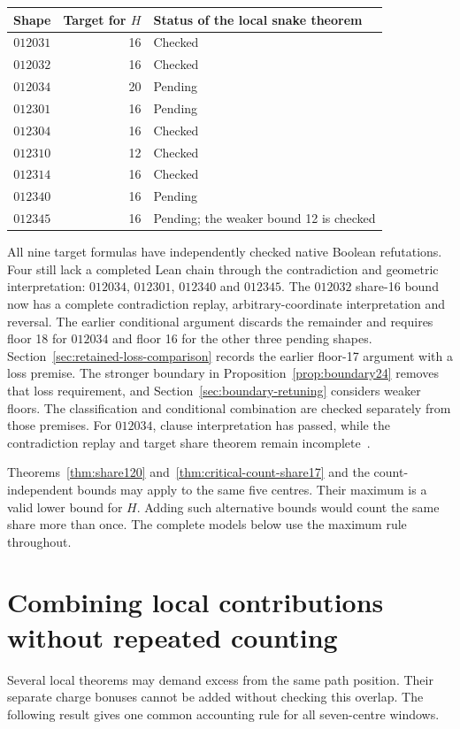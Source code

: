 \documentclass[11pt,a4paper]{article}
\theoremstyle{definition}
\theoremstyle{remark}
\begin{document}
\begin{center}\small
\begin{tabular}{c r l}
\toprule
Shape & Target for $H$ & Status of the local snake theorem\\\midrule
$012031$ & 16 & Checked\\
$012032$ & 16 & Checked\\
$012034$ & 20 & Pending\\
$012301$ & 16 & Pending\\
$012304$ & 16 & Checked\\
$012310$ & 12 & Checked\\
$012314$ & 16 & Checked\\
$012340$ & 16 & Pending\\
$012345$ & 16 & Pending; the weaker bound 12 is checked\\
\bottomrule
\end{tabular}
\end{center}
All nine target formulas have independently checked native Boolean refutations. Four still lack a completed Lean chain through the contradiction and geometric interpretation: $012034$, $012301$, $012340$ and $012345$. The $012032$ share-16 bound now has a complete contradiction replay, arbitrary-coordinate interpretation and reversal. The earlier conditional argument discards the remainder and requires floor 18 for $012034$ and floor 16 for the other three pending shapes. Section~\ref{sec:retained-loss-comparison} records the earlier floor-17 argument with a loss premise. The stronger boundary in Proposition~\ref{prop:boundary24} removes that loss requirement, and Section~\ref{sec:boundary-retuning} considers weaker floors. The classification and conditional combination are checked separately from those premises. For $012034$, clause interpretation has passed, while the contradiction replay and target share theorem remain incomplete~\cite{shareclosurearchive,targetsharearchive,share152archive}.

Theorems~\ref{thm:share120} and~\ref{thm:critical-count-share17} and the count-independent bounds may apply to the same five centres. Their maximum is a valid lower bound for $H$. Adding such alternative bounds would count the same share more than once. The complete models below use the maximum rule throughout.


\section{Combining local contributions without repeated counting}\label{sec:common-budget}
Several local theorems may demand excess from the same path position. Their separate charge bonuses cannot be added without checking this overlap. The following result gives one common accounting rule for all seven-centre windows.
\end{document}
